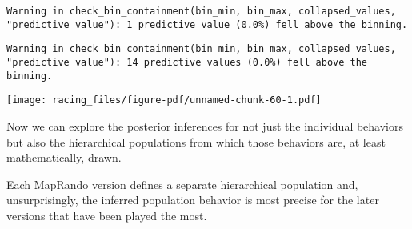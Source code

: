 \documentclass[
  letterpaper,
  DIV=11,
  numbers=noendperiod]{scrartcl}
\begin{document}
\begin{verbatim}
Warning in check_bin_containment(bin_min, bin_max, collapsed_values,
"predictive value"): 1 predictive value (0.0%) fell above the binning.
\end{verbatim}

\begin{verbatim}
Warning in check_bin_containment(bin_min, bin_max, collapsed_values,
"predictive value"): 14 predictive values (0.0%) fell above the binning.
\end{verbatim}

\texttt{[image: racing\_files/figure-pdf/unnamed-chunk-60-1.pdf]}

Now we can explore the posterior inferences for not just the individual
behaviors but also the hierarchical populations from which those
behaviors are, at least mathematically, drawn.

Each MapRando version defines a separate hierarchical population and,
unsurprisingly, the inferred population behavior is most precise for the
later versions that have been played the most.
\end{document}
